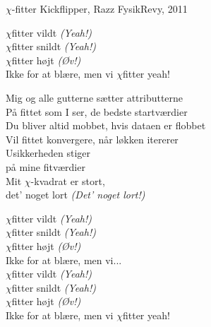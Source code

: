 \begin{song}{$\chi$-fitter}
  {} %
  {Kickflipper, Razz} %
  {} %
  {FysikRevy, 2011} %
  {\NotCCLIed} %

  \begin{SBChorus}
    $\chi$fitter vildt \emph{(Yeah!)}\\
    $\chi$fitter snildt \emph{(Yeah!)}\\
    $\chi$fitter højt \emph{(Øv!)}\\
    Ikke for at blære, men vi $\chi$fitter yeah!
  \end{SBChorus}

  \begin{SBVerse}
    Mig og alle gutterne sætter attributterne\\
    På fittet som I ser, de bedste startværdier\\
    Du bliver altid mobbet, hvis dataen er flobbet\\
    Vil fittet konvergere, når løkken itererer\\\medskip
    Usikkerheden stiger\\
    på mine fitværdier\\
    Mit $\chi$-kvadrat er stort,\\
    det' noget lort \emph{(Det' noget lort!)}
  \end{SBVerse}

  \begin{SBChorus}
    $\chi$fitter vildt \emph{(Yeah!)}\\
    $\chi$fitter snildt \emph{(Yeah!)}\\
    $\chi$fitter højt \emph{(Øv!)}\\
    Ikke for at blære, men vi...\\\medskip
    $\chi$fitter vildt \emph{(Yeah!)}\\
    $\chi$fitter snildt \emph{(Yeah!)}\\
    $\chi$fitter højt \emph{(Øv!)}\\
    Ikke for at blære, men vi $\chi$fitter yeah!
  \end{SBChorus}


\end{song}

